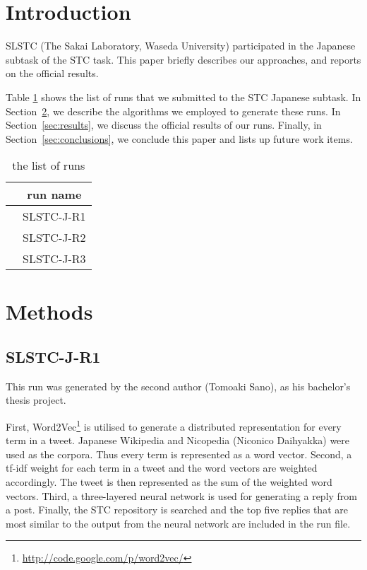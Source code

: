 \documentclass{../style/sig-alternate}
\begin{document}

\section{Introduction}

SLSTC (The Sakai Laboratory, Waseda University) participated in the
Japanese subtask of the STC task.
This paper briefly describes our approaches,
and reports on the official results.

Table \ref{tab:run_list}  shows the list of runs that we submitted to the STC Japanese subtask.
In Section~\ref{sec:methods}, we describe the algorithms we employed
to generate these runs.
In Section~\ref{sec:results}, we discuss the official results of our runs.
Finally, in Section~\ref{sec:conclusions}, we conclude this paper
and lists up future work items.

\begin{table}[h!]
  \centering
  \caption{the list of runs}
  \label{tab:run_list}
  \begin{tabular}{|c|} \hline
    　run name \\ \hline
    　SLSTC-J-R1 \\ \hline
    　SLSTC-J-R2 \\ \hline
    　SLSTC-J-R3 \\ \hline
  \end{tabular}
\end{table}

\section{Methods}
\label{sec:methods}

\subsection{SLSTC-J-R1}

This run was generated by the second author (Tomoaki Sano), as his bachelor's thesis project.

First, Word2Vec\footnote{\url{http://code.google.com/p/word2vec/}} is utilised
to generate a distributed representation for every term in a tweet. Japanese Wikipedia and Nicopedia (Niconico Daihyakka) were used as the corpora. Thus every term is represented as a word vector. Second, a tf-idf weight for each term in a tweet and the word vectors are weighted accordingly. The tweet is then represented as the sum of the weighted word vectors. Third, a three-layered neural network is used for generating a reply from a post. Finally, the STC repository is searched and 
the top five replies that are most similar to the output from the neural network are 
included in the run file.
\end{document}
